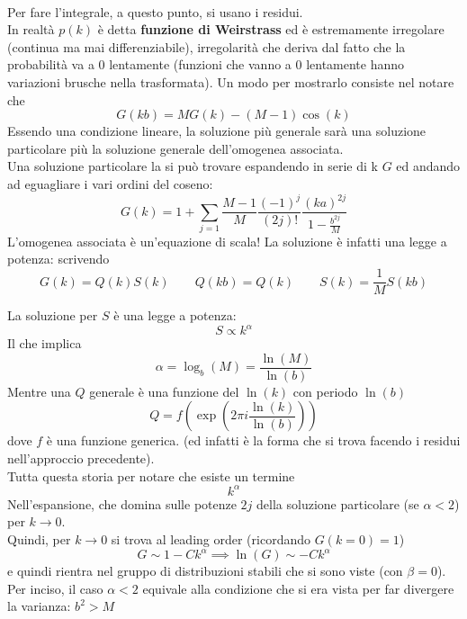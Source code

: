 \documentclass[a4paper,12pt]{article}
\theoremstyle{plain}
\theoremstyle{definition}
\newcommand{\f}[2]{\frac{#1}{#2}}
\newcommand{\ra}{\rightarrow}
\theoremstyle{remark}
\begin{document}
	\\	Per fare l'integrale, a questo punto, si usano i residui.
	\\In realtà $p(k)$ è detta \textbf{funzione di Weirstrass} ed è estremamente irregolare (continua ma mai differenziabile), irregolarità che deriva dal fatto che la probabilità va a 0 lentamente (funzioni che vanno a 0 lentamente hanno variazioni brusche nella trasformata).
Un modo per mostrarlo consiste nel notare che
\[G(kb)={M}G(k)-{(M-1)}{}\cos(k )		\]
Essendo una condizione lineare, la soluzione più generale sarà una soluzione particolare più la soluzione generale dell'omogenea associata.\\ Una soluzione particolare la si può trovare espandendo in serie di k $G$ ed andando ad eguagliare i vari ordini del coseno:
\[G(k)=1+\sum_{j=1}\f{M-1}{M		}\f{(-1)^j}{(2j)! }\f{(ka)^{2j}}{1-\f{b^{2j}}{M	}}	\]
L'omogenea associata è un'equazione di scala! La soluzione è infatti una legge a potenza: scrivendo
\[G(k)=Q(k)S(k)	\quad	\quad Q(k b)=Q(k)\quad \quad S(k)=\f{1}{M}S(kb)		\]

La soluzione per $S$ è una legge a potenza:
\[S\propto	k^{\alpha}		\]
Il che implica \[\alpha=\log_b(M)=\f{\ln (M)}{\ln(b)}\]
Mentre una $Q$ generale è una funzione del $\ln(k)$ con periodo $\ln(b)$ 
\[	Q=f\left(\exp(2 \pi i \f{\ln (k)}{\ln (b)})\right)			\]
dove $f$ è una funzione generica. (ed infatti è la forma che si trova facendo i residui nell'approccio precedente).\\ Tutta questa storia per notare che esiste un termine 
\[	k^{\alpha}		\]
Nell'espansione, che domina sulle potenze $2j$ della soluzione particolare (se $\alpha<2$) per $k\ra 0$. \\Quindi, per $k\ra 0$ si trova al leading order (ricordando $G(k=0)=1$)
\[G\sim 1- C k^{\alpha}	\implies\ln(G)\sim -C k^{\alpha}	\]
e quindi rientra nel gruppo di distribuzioni stabili che si sono viste (con $\beta=0$).	
\\Per inciso, il caso $\alpha<2$ equivale alla condizione che si era vista per far divergere la varianza: $b^2>M$
\end{document}
